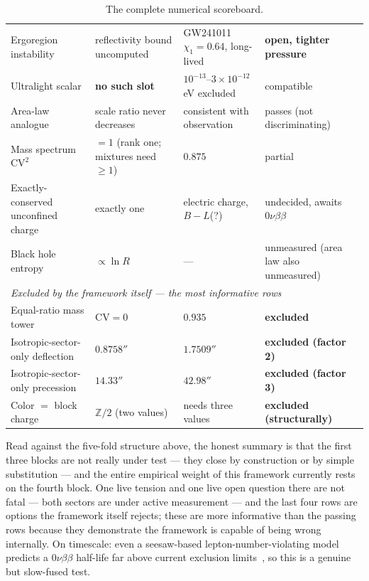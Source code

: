 \documentclass[pdflatex,sn-mathphys-num]{sn-jnl}
\theoremstyle{thmstyleone}
\theoremstyle{thmstylethree}
\theoremstyle{thmstyletwo}
\begin{document}
\begin{table}[htbp]
\begin{tabular}{p{}p{}p{}p{}}
Ergoregion instability & reflectivity bound uncomputed & GW241011 $\chi_1=0.64$, long-lived & \textbf{open, tighter pressure} \\
Ultralight scalar & \textbf{no such slot} & $10^{-13}$--$3\times10^{-12}\,$eV excluded & compatible \\
Area-law analogue & scale ratio never decreases & consistent with observation & passes (not discriminating) \\
Mass spectrum $\mathrm{CV}^2$ & $=1$ (rank one; mixtures need $\geq1$) & $0.875$ & partial \\
Exactly-conserved unconfined charge & exactly one & electric charge, $B{-}L$(?) & undecided, awaits $0\nu\beta\beta$ \\
Black hole entropy & $\propto \ln R$ & --- & unmeasured (area law also unmeasured) \\
\midrule
\multicolumn{4}{l}{\emph{Excluded by the framework itself — the most informative rows}}\\
Equal-ratio mass tower & $\mathrm{CV}=0$ & $0.935$ & \textbf{excluded} \\
Isotropic-sector-only deflection & $0.8758''$ & $1.7509''$ & \textbf{excluded (factor 2)} \\
Isotropic-sector-only precession & $14.33''$ & $42.98''$ & \textbf{excluded (factor 3)} \\
Color $=$ block charge & $\mathbb{Z}/2$ (two values) & needs three values & \textbf{excluded (structurally)} \\
\bottomrule
\end{tabular}
\caption{The complete numerical scoreboard.}
\label{tab:scoreboard}
\end{table}
\FloatBarrier

Read against the five-fold structure above, the honest summary is that
the first three blocks are not really under test — they close by
construction or by simple substitution — and the entire empirical weight
of this framework currently rests on the fourth block. One live tension
and one live open question there are not fatal — both sectors
are under active measurement — and the last four rows are options the
framework itself rejects; these are more informative than the passing
rows because they demonstrate the framework is capable of being wrong
internally. On timescale: even a seesaw-based lepton-number-violating
model predicts a $0\nu\beta\beta$ half-life far above current exclusion
limits~\cite{KamLANDZen2023}, so this is a genuine but slow-fused test.
\end{document}
